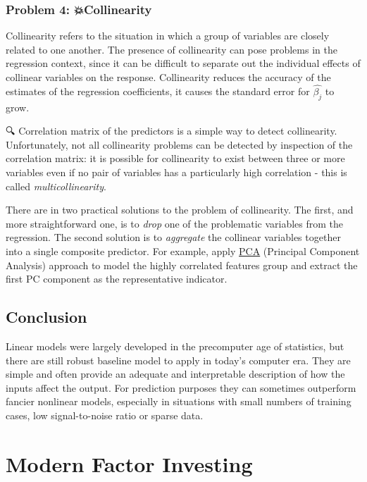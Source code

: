 \documentclass[
]{book}
\begin{document}
\hypertarget{problem-4-collinearity}{%
\subsection*{Problem 4: 💥Collinearity}\label{problem-4-collinearity}}

Collinearity refers to the situation in which a group of variables are closely related to one another. The presence of collinearity can pose problems in the regression context, since it can be difficult to separate out the individual effects of collinear variables on the response. Collinearity reduces the accuracy of the estimates of the regression coefficients, it causes the standard error for \(\hat{\beta_j}\) to grow.

🔍 {Correlation matrix of the predictors} is a simple way to detect collinearity. Unfortunately, not all collinearity problems can be detected by inspection of the correlation matrix: it is possible for collinearity to exist between three or more variables even if no pair of variables has a particularly high correlation - this is called {\emph{multicollinearity}}.

There are in two practical solutions to the problem of collinearity. The first, and more straightforward one, is to {\emph{drop}} one of the problematic variables from the regression. The second solution is to {\emph{aggregate}} the collinear variables together into a single composite predictor. For example, apply \href{https://en.wikipedia.org/wiki/Principal_component_analysis}{PCA} (Principal Component Analysis) approach to model the highly correlated features group and extract the first PC component as the representative indicator.

\hypertarget{conclusion}{%
\section{Conclusion}\label{conclusion}}

Linear models were largely developed in the precomputer age of statistics, but there are still robust baseline model to apply in today's computer era. They are simple and often provide an adequate and interpretable description of how the inputs affect the output. For prediction purposes they can sometimes outperform fancier nonlinear models, especially in situations with small numbers of training cases, low signal-to-noise ratio or sparse data.

\hypertarget{modern-factor-investing}{%
\chapter{Modern Factor Investing}\label{modern-factor-investing}}
\end{document}
